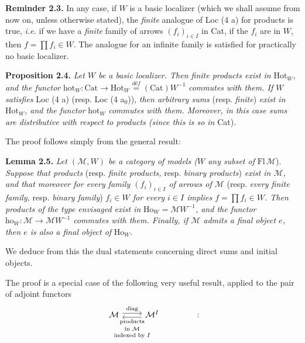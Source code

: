 \textbf{Reminder 2.3.} In any case, if $W$ is a basic localizer (which we shall assume from now on, unless otherwise stated), the \textit{finite} analogue of Loc (4 a) for products is true, \textit{i.e.} if we have a \textit{finite} family of arrows $(f_i)_{i\in I}$ in Cat, if the $f_i$ are in $W$, then $f = \prod f_i \in W$. The analogue for an infinite family is satisfied for practically no basic localizer.

\textbf{Proposition 2.4.} \textit{Let $W$ be a basic localizer. Then finite products exist in} $\mathrm{Hot}_W$\textit{, and the functor} $\mathrm{hot}_W : \mathrm{Cat} \longrightarrow \mathrm{Hot}_W \overset{\textit{déf}}{=} (\mathrm{Cat})W^{-1}$ \textit{commutes with them. If $W$ satisfies} Loc (4 a) (resp. Loc (4 a$_0$)), \textit{then arbitrary sums} (resp. \textit{finite}) \textit{exist in} $\mathrm{Hot}_W$\textit{, and the functor} $\mathrm{hot}_W$ \textit{commutes with them. Moreover, in this case sums are distributive with respect to products (since this is so in} Cat).

The proof follows simply from the general result:

\textbf{Lemma 2.5.} \textit{Let $(\mathcal{M}, W)$ be a category of models ($W$ any subset of} $\mathrm{Fl}\,\mathcal{M}$). \textit{Suppose that products} (resp. \textit{finite products,} resp. \textit{binary products}) \textit{exist in $\mathcal{M}$, and that moreover for every family $(f_i)_{i\in I}$ of arrows of $\mathcal{M}$} (resp. \textit{every finite family,}
resp. \textit{binary family}) \textit{$f_i \in W$ for every $i \in I$ implies $f = \prod f_i \in W$. Then products of the type envisaged exist in} $\mathrm{Ho}_W = \mathcal{M}W^{-1}$\textit{, and the functor} $\mathrm{ho}_W : \mathcal{M} \longrightarrow \mathcal{M}W^{-1}$ \textit{commutes with them. Finally, if $\mathcal{M}$ admits a final object $e$, then $e$ is also a final object of} $\mathrm{Ho}_W$.



We deduce from this the dual statements concerning direct sums and initial objects.

The proof is a special case of the following very useful result, applied to the pair of adjoint functors
\[
\begin{tikzcd}
\mathcal{M} \arrow[r, shift left, "\mathrm{diag}"] & \mathcal{M}^I \arrow[l, shift left, "\text{\scriptsize\shortstack{products\\ in $\mathcal{M}$\\ indexed by $I$}}"]
\end{tikzcd}
\qquad\qquad :
\]


